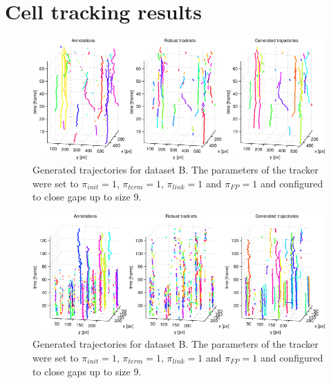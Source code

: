 \chapter{Cell tracking results}
	\label{app:appendix_trackingresults}

\begin{figure}
	\includegraphics[width=\textwidth]{images/fig_results_tracker_dataset_2}
	\caption{Generated trajectories for dataset B. The parameters of the tracker were set to $\pi_{init}=1$, $\pi_{term}=1$, $\pi_{link}=1$ and $\pi_{FP}=1$ and configured to close gaps up to size 9.}
	\label{fig:fig_results_tracker_dataset_2}
\end{figure}


\begin{figure}
	\includegraphics[width=\textwidth]{images/fig_results_tracker_dataset_3}
	\caption{Generated trajectories for dataset B. The parameters of the tracker were set to $\pi_{init}=1$, $\pi_{term}=1$, $\pi_{link}=1$ and $\pi_{FP}=1$ and configured to close gaps up to size 9.}
	\label{fig:fig_results_tracker_dataset_3}
\end{figure}

